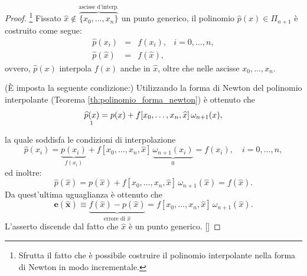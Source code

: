 \begin{proof}
    \footnote{Sfrutta il fatto che è possibile costruire il polinomio interpolante nella forma di Newton in modo incrementale.} Fissato $\widehat x\notin\overbrace{\{x_0,\hdots,x_n\}}^{\text{ascisse d'interp.}}$ un punto generico, il polinomio $\widehat p(x)\in\Pi_{n+1}$ è costruito come segue:
    \begin{equation*}
        \begin{matrix}
            \widehat p(x_i)&=&f(x_i),& i=0,\hdots,n,\\
        \widehat p(\widehat x) &=& f(\widehat x),
        \end{matrix}
    \end{equation*}
    ovvero, $\widehat p(x)$ interpola $f(x)$ anche in $\widehat x$, oltre che nelle ascisse $x_0,\hdots,x_n$.
    
    (È imposta la seguente condizione:) Utilizzando la forma di Newton del polinomio interpolante (Teorema \ref{th:polinomio_forma_newton}) è ottenuto che
    \begin{equation*}
        \underset{\footnotemark}{\widehat p(x)} = p(x) + f[x_0,\hdots,x_n,\widehat x]\,\omega_{n+1}(x),
    \end{equation*}
    la quale soddisfa le condizioni di interpolazione
    \begin{equation*}
        \widehat p(x_i)=\underbrace{p(x_i)}_{f(x_i)} + f[x_0,\hdots,x_n,\widehat x]\,\underbrace{\omega_{n+1}(x_i)}_{0} \boldsymbol = f(x_i),\quad i=0,\hdots,n,
    \end{equation*}
    ed inoltre:
    \begin{equation*}
        \widehat p(\widehat x)=p(\widehat x)+ f[x_0,\hdots,x_n,\widehat x]\,\omega_{n+1}(\widehat x)\boldsymbol = f(\widehat x).
    \end{equation*}
    Da quest'ultima uguaglianza è ottenuto che
    \begin{equation*}
        \boldsymbol{e(\widehat x)\equiv} \underbrace{f(\widehat x) - p(\widehat x)}_{\text{errore di $\widehat x$}}=f[x_0,\hdots,x_n,\widehat x]\,\omega_{n+1}(\widehat x).
    \end{equation*}
    L'asserto discende dal fatto che $\widehat x$ è un punto generico. [\footnotemark]
\end{proof}

\addtocounter{footnote}{-1}

